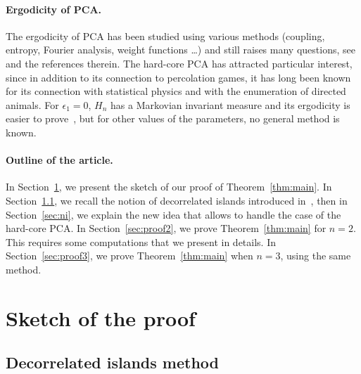 \documentclass[11pt]{article}
\theoremstyle{plain}
\theoremstyle{definition}
\theoremstyle{remark}
\newcommand{\hard}[1]{H_{#1}}
\begin{document}
\paragraph{Ergodicity of PCA.} The ergodicity of PCA has been studied using various methods (coupling, entropy, Fourier analysis, weight functions \ldots) and still raises many questions, see~\cite{TOOM90,MM14b,MST19} and the references therein. The hard-core PCA has attracted particular interest, since in addition to its connection to percolation games, it has long been known for its connection with statistical physics and with the enumeration of directed animals. For $\epsilon_1=0$, $\hard{n}$ has a Markovian invariant measure and its ergodicity is easier to prove~\cite{HMM19}, but for other values of the parameters, no general method is known.

\paragraph{Outline of the article.} In Section~\ref{sec:Heuristic}, we present the sketch of our proof of Theorem~\ref{thm:main}. In Section~\ref{sec:di}, we recall the notion of decorrelated islands introduced in~\cite{Casse23}, then in Section~\ref{sec:ni}, we explain the new idea that allows to handle the case of the hard-core PCA. In Section~\ref{sec:proof2}, we prove Theorem~\ref{thm:main} for $n=2$. This requires some computations that we present in details. In Section~\ref{sec:proof3}, we prove Theorem~\ref{thm:main} when $n=3$, using the same method. 

\section{Sketch of the proof}\label{sec:Heuristic}

\subsection{Decorrelated islands method} \label{sec:di}
\end{document}
